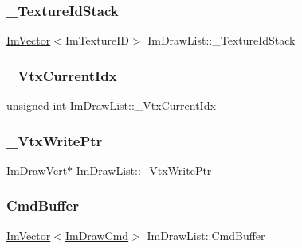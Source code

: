\hypertarget{struct_im_draw_list_a848faddd121da050214b8d8159e5e704}{}\label{struct_im_draw_list_a848faddd121da050214b8d8159e5e704} 
\subsubsection{\texorpdfstring{\+\_\+\+Texture\+Id\+Stack}{\_TextureIdStack}}
{\footnotesize\ttfamily \hyperlink{class_im_vector}{Im\+Vector}$<$Im\+Texture\+ID$>$ Im\+Draw\+List\+::\+\_\+\+Texture\+Id\+Stack}

\hypertarget{struct_im_draw_list_a2228793183665bc3d8612795555fe505}{}\label{struct_im_draw_list_a2228793183665bc3d8612795555fe505} 
\subsubsection{\texorpdfstring{\+\_\+\+Vtx\+Current\+Idx}{\_VtxCurrentIdx}}
{\footnotesize\ttfamily unsigned int Im\+Draw\+List\+::\+\_\+\+Vtx\+Current\+Idx}

\hypertarget{struct_im_draw_list_a67f870f5140bf1cab14b8515b7386073}{}\label{struct_im_draw_list_a67f870f5140bf1cab14b8515b7386073} 
\subsubsection{\texorpdfstring{\+\_\+\+Vtx\+Write\+Ptr}{\_VtxWritePtr}}
{\footnotesize\ttfamily \hyperlink{struct_im_draw_vert}{Im\+Draw\+Vert}$\ast$ Im\+Draw\+List\+::\+\_\+\+Vtx\+Write\+Ptr}

\hypertarget{struct_im_draw_list_a67a4b5cc4c83bc3b81d96c46cbd38a07}{}\label{struct_im_draw_list_a67a4b5cc4c83bc3b81d96c46cbd38a07} 
\subsubsection{\texorpdfstring{Cmd\+Buffer}{CmdBuffer}}
{\footnotesize\ttfamily \hyperlink{class_im_vector}{Im\+Vector}$<$\hyperlink{struct_im_draw_cmd}{Im\+Draw\+Cmd}$>$ Im\+Draw\+List\+::\+Cmd\+Buffer}

